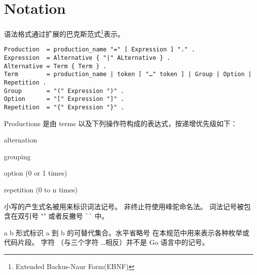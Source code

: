 
\chapter{Notation}
语法格式通过扩展的巴克斯范式\footnote{Extended Backus-Naur Form(EBNF)}表示。
\begin{lstlisting}[style=EBNF]
Production	= production_name "=" [ Expression ] "." .
Expression 	= Alternative { "|" ALternative } .
Alternative = Term { Term } .
Term        = production_name | token [ "…" token ] | Group | Option | Repetition .
Group       = "(" Expression ")" .
Option      = "[" Expression "]" .
Repetition  = "{" Expression "}" .
\end{lstlisting}

Productions 是由 terms 以及下列操作符构成的表达式，按递增优先级如下：
\begin{description}[font=\ttfamily\bfseries, style=nextline, leftmargin=2\parindent, labelindent=\parindent]
	\item [|] alternation
	\item [()] grouping
	\item [{[]}] option (0 or 1 times)
	\item [\{\}] repetition (0 to n times)
\end{description}
小写的产生式名被用来标识词法记号。
非终止符使用峰驼命名法。
词法记号被包含在双引号 "" 或者反撇号 \lstinline|``| 中。

 a \hdots{} b 形式标识 a 到 b 的可替代集合。水平省略号 \hdots 在本规范中用来表示各种枚举或代码片段。
 字符 \hdots（与三个字符 \ldots 相反）并不是 Go 语言中的记号。